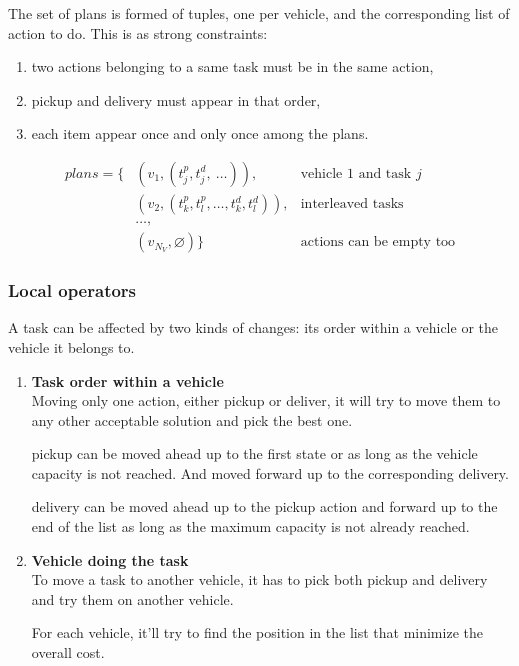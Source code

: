 \documentclass[11pt,a4paper]{article}
\begin{document}
The set of plans is formed of tuples, one per vehicle, and the corresponding
list of action to do. This is as strong constraints:

\begin{enumerate}
    \item two actions belonging to a same task must be in the same action,

    \item pickup and delivery must appear in that order,

    \item each item appear once and only once among the plans.
\end{enumerate}

\begin{align*}
plans = \{&(v_1, (t_j^p, t_j^d, \: \dots)),            & \text{vehicle $1$ and task $j$} \\
          &(v_2, (t_k^p, t_l^p, \dots, t_k^d, t_l^d)), & \text{interleaved tasks} \\
          &\dots,                                      & \\
          &(v_{N_V}, \varnothing)\}                    & \text{actions can be empty too}
\end{align*}

\subsubsection*{Local operators}

A task can be affected by two kinds of changes: its order within a vehicle or
the vehicle it belongs to.

\begin{enumerate}
    \item \textbf{Task order within a vehicle} \\
        Moving only one action, either pickup or deliver, it will try to
        move them to any other acceptable solution and pick the best one.

        pickup can be moved ahead up to the first state or as long as the
        vehicle capacity is not reached. And moved forward up to the
        corresponding delivery.

        delivery can be moved ahead up to the pickup action and forward
        up to the end of the list as long as the maximum capacity is not
        already reached.

    \item \textbf{Vehicle doing the task} \\
        To move a task to another vehicle, it has to pick both pickup and
        delivery and try them on another vehicle.

        For each vehicle, it'll try to find the position in the list that
        minimize the overall cost.

\end{enumerate}
\end{document}
